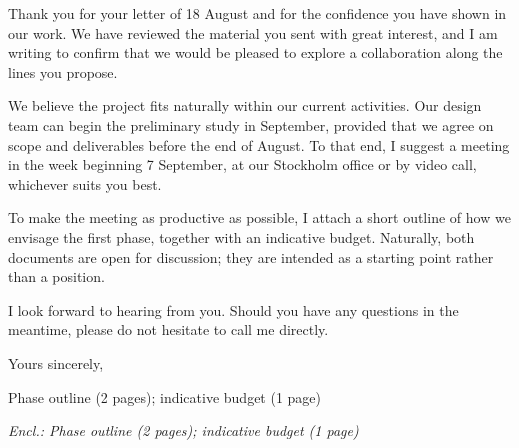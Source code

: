 \expandafter\documentclass\expandafter[\ClassOpts]{article}
\makeatletter
\newcommand{\IfNonEmpty}[2]{%
  \def\hrv@test{#1}%
  \if\relax\hrv@test\relax
    \expandafter\@gobble
  \else
    \expandafter\@firstofone
  \fi
  {#2}}
\newcommand{\Enclosures}[1]{\IfNonEmpty{#1}{{\footnotesize\itshape Encl.: #1\par}}}
\newcommand{\CopiesTo}[1]{\IfNonEmpty{#1}{{\footnotesize\itshape cc: #1\par}}}
\makeatother
\begin{document}
Thank you for your letter of 18 August and for the confidence you have
shown in our work.  We have reviewed the material you sent with great
interest, and I am writing to confirm that we would be pleased to
explore a collaboration along the lines you propose.

We believe the project fits naturally within our current activities.
Our design team can begin the preliminary study in September, provided
that we agree on scope and deliverables before the end of August.  To
that end, I suggest a meeting in the week beginning 7 September, at
our Stockholm office or by video call, whichever suits you best.

To make the meeting as productive as possible, I attach a short outline
of how we envisage the first phase, together with an indicative budget.
Naturally, both documents are open for discussion; they are intended as
a starting point rather than a position.

I look forward to hearing from you.  Should you have any questions in
the meantime, please do not hesitate to call me directly.

\vspace{2mm}
Yours sincerely,

\vspace{12mm}   %


{\setlength{\parskip}{0pt}%
\textbf{\SenderName}\par
\IfNonEmpty{\SenderTitle}{{\footnotesize\itshape\color{MutedText}\SenderTitle\par}\vspace{4pt}}%
{\footnotesize\itshape\color{MutedText}\Organisation\par}}

\vspace{2mm}
\Enclosures{Phase outline (2 pages); indicative budget (1 page)}
\end{document}
